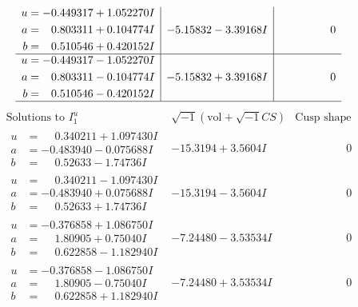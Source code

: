 \documentclass[1p]{elsarticle_modified}
\theoremstyle{definition}
\newcommand{\I}{\sqrt{-1}}
\begin{document}
$$\begin{array}{c|c|c}
\begin{aligned}
u &= -0.449317 + 1.052270 I \\
a &= \phantom{-}0.803311 + 0.104774 I \\
b &= \phantom{-}0.510546 + 0.420152 I\end{aligned}
 & -5.15832 - 3.39168 I & \phantom{-0.000000 } 0 \\ \hline\begin{aligned}
u &= -0.449317 - 1.052270 I \\
a &= \phantom{-}0.803311 - 0.104774 I \\
b &= \phantom{-}0.510546 - 0.420152 I\end{aligned}
 & -5.15832 + 3.39168 I & \phantom{-0.000000 } 0\\
 \hline 
 \end{array}$$\newpage$$\begin{array}{c|c|c}  
\text{Solutions to }I^u_{1}& \I (\text{vol} + \sqrt{-1}CS) & \text{Cusp shape}\\
 \hline 
\begin{aligned}
u &= \phantom{-}0.340211 + 1.097430 I \\
a &= -0.483940 - 0.075688 I \\
b &= \phantom{-}0.52633 - 1.74736 I\end{aligned}
 & -15.3194 + 3.5604 I & \phantom{-0.000000 } 0 \\ \hline\begin{aligned}
u &= \phantom{-}0.340211 - 1.097430 I \\
a &= -0.483940 + 0.075688 I \\
b &= \phantom{-}0.52633 + 1.74736 I\end{aligned}
 & -15.3194 - 3.5604 I & \phantom{-0.000000 } 0 \\ \hline\begin{aligned}
u &= -0.376858 + 1.086750 I \\
a &= \phantom{-}1.80905 + 0.75040 I \\
b &= \phantom{-}0.622858 - 1.182940 I\end{aligned}
 & -7.24480 - 3.53534 I & \phantom{-0.000000 } 0 \\ \hline\begin{aligned}
u &= -0.376858 - 1.086750 I \\
a &= \phantom{-}1.80905 - 0.75040 I \\
b &= \phantom{-}0.622858 + 1.182940 I\end{aligned}
 & -7.24480 + 3.53534 I & \phantom{-0.000000 } 0 \\ \hline\begin{aligned}

\end{aligned}
\end{array}$$
\end{document}
